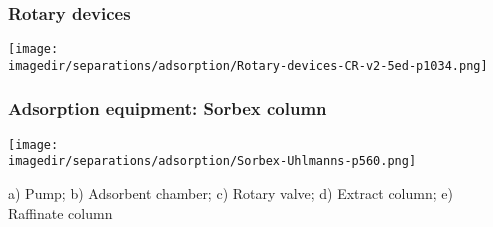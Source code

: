\begin{frame}\frametitle{Rotary devices}
	\begin{center}
		\texttt{[image: \\imagedir/separations/adsorption/Rotary-devices-CR-v2-5ed-p1034.png]}
	\end{center}
	\vspace{-12pt}
\end{frame}

\begin{frame}\frametitle{Adsorption equipment: Sorbex column}
	\begin{center}
		\texttt{[image: \\imagedir/separations/adsorption/Sorbex-Uhlmanns-p560.png]}
	\end{center}
	
	{\scriptsize a) Pump; b) Adsorbent chamber; c) Rotary valve; d) Extract column; e) Raffinate column}
	
	
	

\end{frame}
